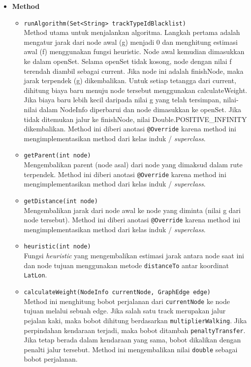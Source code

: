 \begin{itemize}
    \item \textbf{Method}
    \begin{itemize}
        \item \texttt{runAlgorithm(Set<String> trackTypeIdBlacklist)}
        \\ Method utama untuk menjalankan algoritma. Langkah pertama adalah mengatur jarak dari node awal (g) menjadi 0 dan menghitung estimasi awal (f) menggunakan fungsi heuristic. Node awal kemudian dimasukkan ke dalam openSet. Selama openSet tidak kosong, node dengan nilai f terendah diambil sebagai current. Jika node ini adalah finishNode, maka jarak terpendek (g) dikembalikan. Untuk setiap tetangga dari current, dihitung biaya baru menuju node tersebut menggunakan calculateWeight. Jika biaya baru lebih kecil daripada nilai g yang telah tersimpan, nilai-nilai dalam NodeInfo diperbarui dan node dimasukkan ke openSet. Jika tidak ditemukan jalur ke finishNode, nilai Double.POSITIVE\_INFINITY dikembalikan. Method ini diberi anotasi \texttt{@Override} karena method ini mengimplementasikan method dari kelas induk / \textit{superclass}.

        \item \texttt{getParent(int node)}
        \\ Mengembalikan parent (node asal) dari node yang dimaksud dalam rute terpendek. Method ini diberi anotasi \texttt{@Override} karena method ini mengimplementasikan method dari kelas induk / \textit{superclass}.

        \item \texttt{getDistance(int node)}
        \\ Mengembalikan jarak dari node awal ke node yang diminta (nilai g dari node tersebut). Method ini diberi anotasi \texttt{@Override} karena method ini mengimplementasikan method dari kelas induk / \textit{superclass}.

        \item \texttt{heuristic(int node)}
        \\ Fungsi \textit{heuristic} yang mengembalikan estimasi jarak antara node saat ini dan node tujuan menggunakan metode \texttt{distanceTo} antar koordinat \texttt{LatLon}.

        \item \texttt{calculateWeight(NodeInfo currentNode, GraphEdge edge)}
        \\ Method ini menghitung bobot perjalanan dari \texttt{currentNode} ke node tujuan melalui sebuah edge. Jika salah satu track merupakan jalur pejalan kaki, maka bobot dihitung berdasarkan \texttt{multiplierWalking}. Jika perpindahan kendaraan terjadi, maka bobot ditambah \texttt{penaltyTransfer}. Jika tetap berada dalam kendaraan yang sama, bobot dikalikan dengan penalti jalur tersebut. Method ini mengembalikan nilai \texttt{double} sebagai bobot perjalanan.
    \end{itemize}
\end{itemize}


